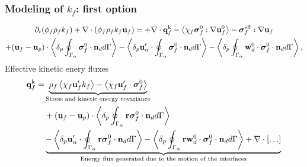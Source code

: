 \documentclass{sintefbeamer}
\begin{document}
\begin{frame}
  \frametitle{Modeling of $k_f$: first option}

\begin{multline}
  \partial_t (\phi_f\rho_fk_f)  
    + \mathbf{\nabla}\cdot (
        \phi_f\rho_fk_f\textbf{u}_f
        )
        = 
      + \mathbf{\nabla}\cdot  \textbf{q}_f^\text{k}
    - \left<\chi_f\bm{\sigma}_f^0 : \mathbf{\nabla} \textbf{u}_f^0\right>
    - \bm{\sigma}_f^\text{eff} : \mathbf{\nabla} \textbf{u}_f
    \nonumber \\
    + (\textbf{u}_f - \textbf{u}_p)\cdot \left<\delta_p \oint_{\Gamma_{\alpha}} {\bm{\sigma}_f^0 \cdot \textbf{n}_d} d\Gamma\right> 
    - \left<\delta_p  \textbf{u}_\alpha' \cdot \oint_{\Gamma_{\alpha}}   \bm{\sigma}_f^0 \cdot \textbf{n}_d d\Gamma\right>
    - \left<\delta_p  \oint_{\Gamma_{\alpha}} \textbf{w}_d^0 \cdot \bm{\sigma}_f^0 \cdot \textbf{n}_d d\Gamma\right>,
\end{multline}
Effective kinetic enery fluxes
\begin{align*}
     \textbf{q}_f^\text{k}
    =& \underbrace{\rho_f \left<\chi_f \textbf{u}_f' k_f\right> 
    - \left<\chi_f \textbf{u}_f' \cdot \bm{\sigma}_f^0\right>}_\text{Stress and kinetic energy covariance}\\
    &+ (\textbf{u}_f - \textbf{u}_p)\cdot
    \left<\delta_p \oint_{\Gamma_{\alpha}} {\textbf{r}\bm{\sigma}_f^0 \cdot \textbf{n}_d} d\Gamma\right>\\
    &
    \underbrace{- \left<\delta_p  \textbf{u}_\alpha' \cdot \oint_{\Gamma_{\alpha}}  \textbf{r} \bm{\sigma}_f^0 \cdot \textbf{n}_d d\Gamma\right>
    - \left<\delta_p  \oint_{\Gamma_{\alpha}} \textbf{r}\textbf{w}_d^0 \cdot \bm{\sigma}_f^0 \cdot \textbf{n}_d d\Gamma\right>
    + \mathbf{\nabla}\cdot[\ldots]}_\text{Energy flux generated due to the motion of the interfaces}
\end{align*}

\end{frame}
\end{document}
